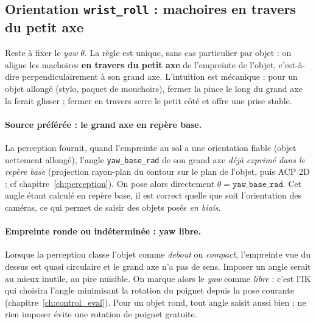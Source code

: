 \subsection{Orientation \texttt{wrist\_roll} : machoires en travers du petit axe}
\label{sub:plan_yaw}

Reste à fixer le \textit{yaw} \(\theta\). La règle est unique, sans cas
particulier par objet : on aligne les machoires \textbf{en travers du petit axe}
de l'empreinte de l'objet, c'est-à-dire perpendiculairement à son grand axe.
L'intuition est mécanique : pour un objet allongé (stylo, paquet de mouchoirs),
fermer la pince le long du grand axe la ferait glisser ; fermer en travers serre
le petit côté et offre une prise stable.

\paragraph{Source préférée : le grand axe en repère base.} La perception fournit,
quand l'empreinte au sol a une orientation fiable (objet nettement allongé),
l'angle \texttt{yaw\_base\_rad} de son grand axe \emph{déjà exprimé dans le
repère base} (projection rayon-plan du contour sur le plan de l'objet, puis ACP
2D ; cf chapitre~\ref{ch:perception}). On pose alors directement
\(\theta = \texttt{yaw\_base\_rad}\). Cet angle étant calculé en repère base, il
est correct quelle que soit l'orientation des caméras, ce qui permet de saisir
des objets posés \emph{en biais}.

\paragraph{Empreinte ronde ou indéterminée : yaw libre.} Lorsque la perception
classe l'objet comme \emph{debout} ou \emph{compact}, l'empreinte vue du dessus
est quasi circulaire et le grand axe n'a pas de sens. Imposer un angle serait
au mieux inutile, au pire nuisible. On marque alors le \textit{yaw} comme
\emph{libre} : c'est l'IK qui choisira l'angle minimisant la rotation du poignet
depuis la pose courante (chapitre~\ref{ch:control_eval}). Pour un objet rond,
tout angle saisit aussi bien ; ne rien imposer évite une rotation de poignet
gratuite.

